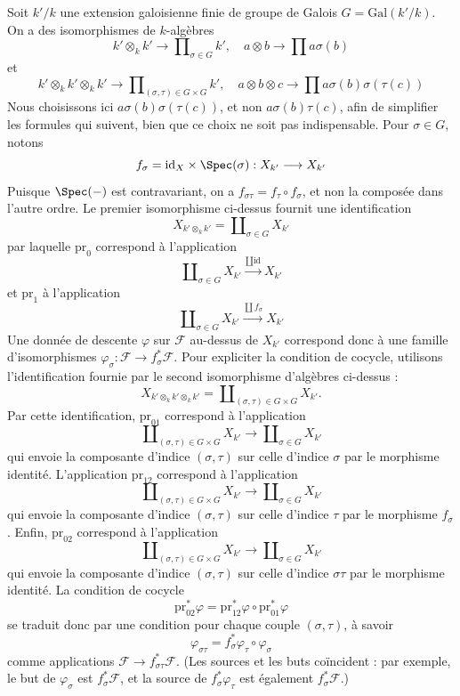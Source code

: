 \medskip\noindent
Soit $k'/k$ une extension galoisienne finie de groupe de Galois
$G = \text{Gal}(k'/k)$. On a des isomorphismes de $k$-algèbres
$$
k' \otimes_k k' \longrightarrow \prod\nolimits_{\sigma \in G} k',\quad
a \otimes b \longrightarrow \prod a\sigma(b)
$$
et
$$
k' \otimes_k k' \otimes_k k' \longrightarrow
\prod\nolimits_{(\sigma, \tau) \in G \times G} k',\quad
a \otimes b \otimes c \longrightarrow \prod a\sigma(b)\sigma(\tau(c))
$$
Nous choisissons ici $a\sigma(b)\sigma(\tau(c))$, et non
$a\sigma(b)\tau(c)$, afin de simplifier les formules qui suivent,
bien que ce choix ne soit pas indispensable. Pour $\sigma \in G$, notons
$$
f_\sigma = \text{id}_X \times \Spec(\sigma) :
X_{k'} \longrightarrow X_{k'}
$$
Puisque $\Spec(-)$ est contravariant, on a
$f_{\sigma \tau} = f_\tau \circ f_\sigma$, et non la composée dans l'autre ordre.
Le premier isomorphisme ci-dessus fournit une identification
$$
X_{k' \otimes_k k'} = \coprod\nolimits_{\sigma \in G} X_{k'}
$$
par laquelle $\text{pr}_0$ correspond à l'application
$$
\coprod\nolimits_{\sigma \in G} X_{k'}
\xrightarrow{\coprod \text{id}}
X_{k'}
$$
et $\text{pr}_1$ à l'application
$$
\coprod\nolimits_{\sigma \in G} X_{k'}
\xrightarrow{\coprod f_\sigma}
X_{k'}
$$
Une donnée de descente $\varphi$ sur $\mathcal{F}$ au-dessus de $X_{k'}$
correspond donc à une famille d'isomorphismes
$\varphi_\sigma : \mathcal{F} \to f_\sigma^*\mathcal{F}$.
Pour expliciter la condition de cocycle, utilisons l'identification
fournie par le second isomorphisme d'algèbres ci-dessus :
$$
X_{k' \otimes_k k' \otimes_k k'} =
\coprod\nolimits_{(\sigma, \tau) \in G \times G} X_{k'}.
$$
Par cette identification, $\text{pr}_{01}$ correspond à l'application
$$
\coprod\nolimits_{(\sigma, \tau) \in G \times G} X_{k'}
\longrightarrow
\coprod\nolimits_{\sigma \in G} X_{k'}
$$
qui envoie la composante d'indice $(\sigma, \tau)$ sur celle d'indice
$\sigma$ par le morphisme identité.
L'application $\text{pr}_{12}$ correspond à l'application
$$
\coprod\nolimits_{(\sigma, \tau) \in G \times G} X_{k'}
\longrightarrow
\coprod\nolimits_{\sigma \in G} X_{k'}
$$
qui envoie la composante d'indice $(\sigma, \tau)$ sur celle d'indice $\tau$
par le morphisme $f_\sigma$. Enfin, $\text{pr}_{02}$ correspond à l'application
$$
\coprod\nolimits_{(\sigma, \tau) \in G \times G} X_{k'}
\longrightarrow
\coprod\nolimits_{\sigma \in G} X_{k'}
$$
qui envoie la composante d'indice $(\sigma, \tau)$ sur celle d'indice
$\sigma\tau$ par le morphisme identité. La condition de cocycle
$$
\text{pr}_{02}^*\varphi = \text{pr}_{12}^*\varphi \circ \text{pr}_{01}^*\varphi
$$
se traduit donc par une condition pour chaque couple $(\sigma, \tau)$, à savoir
$$
\varphi_{\sigma\tau} = f_\sigma^*\varphi_\tau \circ \varphi_\sigma
$$
comme applications $\mathcal{F} \to f_{\sigma\tau}^*\mathcal{F}$.
(Les sources et les buts coïncident : par exemple, le but de $\varphi_\sigma$
est $f_\sigma^*\mathcal{F}$, et la source de
$f_\sigma^*\varphi_\tau$ est également $f_\sigma^*\mathcal{F}$.)

